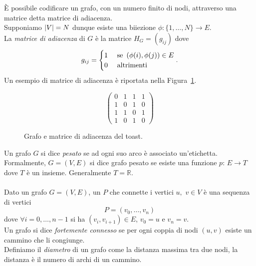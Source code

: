 \`E possibile codificare un grafo, con un numero finito di nodi, attraverso una matrice detta matrice di adiacenza.\\
Supponiamo $\left\vert V\right\vert=N$ dunque esiste una biiezione $\phi:\{ 1, \dots, N\}\to E$.\\La \textit{matrice di adiacenza} di $G$ \`e la matrice $H_G=(g_{ij})$ dove 
$$ g_{ij}=\begin{cases}
1	& \text{ se } \left(  \phi(i), \phi(j) \right) \in E \\
0 &\text{ altrimenti } 
\end{cases}.$$
Un esempio di matrice di adiacenza \`e riportata nella Figura~\ref{fig::toast}.\\
\begin{figure}[!ht]
\centering
\begin{minipage}{.45\textwidth}
\centering
\end{minipage}
\hfill
\begin{minipage}{.45\textwidth}
$$\begin{pmatrix} 0 & 1 & 1 & 1 \\ 1 & 0 & 1 & 0 \\ 1&1 & 0 & 1\\ 1& 0& 1& 0
\end{pmatrix}
$$
\end{minipage}
\caption{Grafo e matrice di adiacenza del toast.}
\label{fig::toast} 
\end{figure}
\newpage
Un grafo $G$ si dice \textit{pesato} se ad ogni suo arco \`e associato un'etichetta.\\
Formalmente, $G=(V,E)$ si dice grafo pesato se esiste una funzione $p:\, E \to T$ dove $T$ \`e un insieme. Generalmente $T=\mathbb{R}$.\\ \\
Dato un grafo $G=(V,E)$, un  $P$ che connette i vertici $u,$ $v\in V$ \`e una sequenza di vertici 
$$ P=\left( v_0, \dots, v_n\right) $$ 
dove $\forall i=0, \dots, n-1$ si ha $(v_i, v_{i+1})\in E$, $v_0=u$ e  $v_n= v$.\\
Un grafo si dice \textit{fortemente connesso} se per ogni coppia di nodi $(u,v)$ esiste un cammino che li congiunge.\\
Definiamo il \textit{diametro} di un grafo come la distanza massima tra  due nodi, la distanza \`e il numero di archi di un cammino.\\

